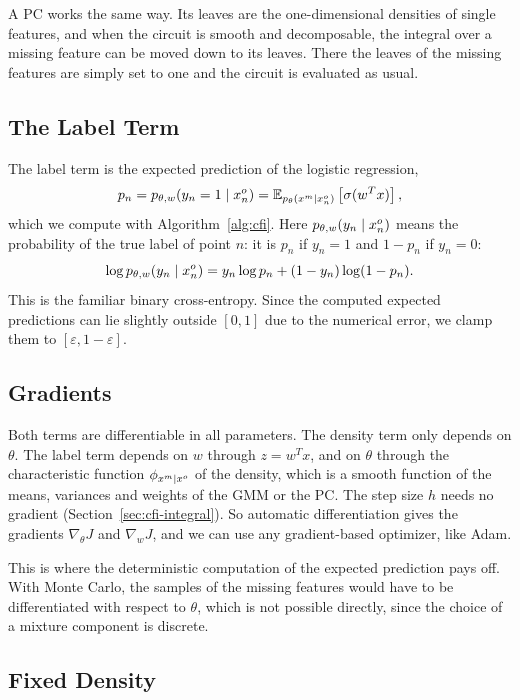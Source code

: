 A PC works the same way. Its leaves are the one-dimensional densities of single
features, and when the circuit is smooth and decomposable, the integral over a
missing feature can be moved down to its leaves. There the
leaves of the missing features are simply set to one and the circuit is evaluated as
usual.

\subsection{The Label Term}

The label term is the expected prediction of the logistic regression,
\[
  p_n = p_{\theta, w}(y_n = 1 \mid x^o_n) = \mathbb{E}_{p_\theta(x^m \mid x^o_n)} \left[ \sigma(w^T x) \right],
\]
which we compute with Algorithm~\ref{alg:cfi}. Here $p_{\theta, w}(y_n \mid x^o_n)$ means the probability of the true label of point $n$: it is
$p_n$ if $y_n = 1$ and $1 - p_n$ if $y_n = 0$:
\[
  \log p_{\theta, w}(y_n \mid x^o_n) = y_n \log p_n + (1 - y_n) \log (1 - p_n).
\]
This is the familiar binary cross-entropy. Since the computed expected predictions can lie slightly outside $[0, 1]$ due to the numerical error,
we clamp them to $[\varepsilon, 1 - \varepsilon]$.

\subsection{Gradients}

Both terms are differentiable in all parameters. The density term only depends on $\theta$. The label term depends on $w$ through
$z = w^T x$, and on $\theta$ through the characteristic function $\phi_{x^m \mid x^o}$ of the density, which is a smooth function of the
means, variances and weights of the GMM or the PC. The step size $h$ needs no gradient (Section~\ref{sec:cfi-integral}).
So automatic differentiation gives the gradients $\nabla_\theta J$ and $\nabla_w J$, and we can use any gradient-based optimizer, like Adam.

This is where the deterministic computation of the expected prediction pays off. With Monte Carlo, the samples of the missing features
would have to be differentiated with respect to $\theta$, which is not possible directly, since the choice of a mixture component is discrete.

\subsection{Fixed Density}
\label{subsec:fixed-density}

